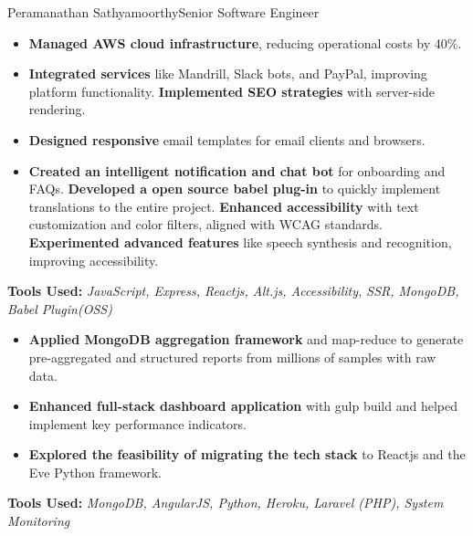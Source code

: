 \documentclass{article}
\begin{document}
\begin{cv}[cvpicture]{Peramanathan Sathyamoorthy}{Senior Software Engineer}
\begin{cvevent}[January 2016][March 2017]
    \begin{itemize}
      \setlength{\itemsep}{0.2em}
      \item \textbf{Managed AWS cloud infrastructure}, reducing operational costs by 40\%.
      \item \textbf{Integrated services} like Mandrill, Slack bots, and PayPal, improving platform functionality. \textbf{Implemented SEO strategies} with server-side rendering.
      \item \textbf{Designed responsive} email templates for email clients and browsers.
      \item \textbf{Created an intelligent notification and chat bot} for onboarding and FAQs. \textbf{Developed a open source babel plug-in} to quickly implement translations to the entire project. \textbf{Enhanced accessibility} with text customization and color filters, aligned with WCAG standards. \textbf{Experimented advanced features} like speech synthesis and recognition, improving accessibility.
    \end{itemize}
    \vspace{1em}

    \textbf{ Tools Used:} \textit{JavaScript, Express, Reactjs, Alt.js, Accessibility, SSR, MongoDB, Babel Plugin(OSS)}

\end{cvevent}
\vspace{1em}

\begin{cvevent}[July 2015][September 2015]
    \begin{itemize}
      \item \textbf{Applied MongoDB aggregation framework} and map-reduce to generate pre-aggregated and structured reports from millions of samples with raw data.
      \item \textbf{Enhanced full-stack dashboard application} with gulp build and helped implement key performance indicators.
      \item \textbf{Explored the feasibility of migrating the tech stack} to Reactjs and the Eve Python framework.
    \end{itemize}
    \vspace{1em}
    \textbf{ Tools Used:} \textit{MongoDB, AngularJS, Python, Heroku, Laravel (PHP), System Monitoring}
    \vspace{1em}


\end{cvevent}
\end{cv}
\end{document}
